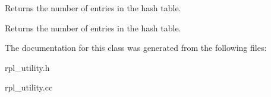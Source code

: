 Returns the number of entries in the hash table.

\begin{DoxyReturn}{Returns}
the number of entries in the hash table. 
\end{DoxyReturn}


The documentation for this class was generated from the following files\+:\begin{DoxyCompactItemize}
\item 
rpl\+\_\+utility.\+h\item 
rpl\+\_\+utility.\+cc\end{DoxyCompactItemize}
